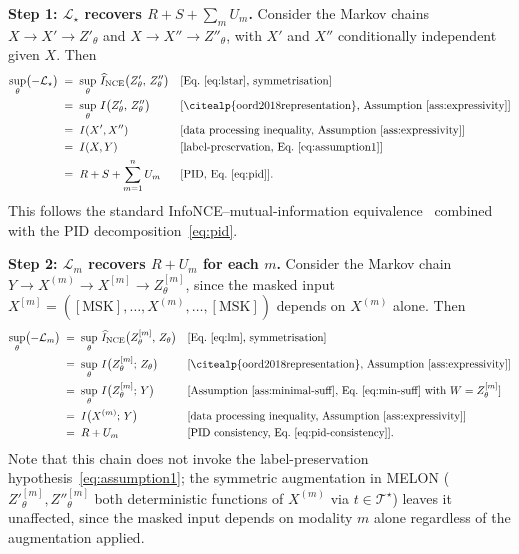 \documentclass{article}
\theoremstyle{plain}
\theoremstyle{definition}
\begin{document}
\textbf{Step 1: $\mathcal{L}_{\star}$ recovers $R + S + \sum_m U_m$.}
Consider the Markov chains $X \to X' \to Z'_\theta$ and $X \to X'' \to Z''_\theta$, with $X'$ and $X''$ conditionally independent given $X$. Then
\begin{equation}\label{eq:step1-chain}
\begin{aligned}
\sup_{\theta} \bigl(-\mathcal{L}_{\star}\bigr)
  \;&=\; \sup_{\theta}\, \widehat{I}_{\mathrm{NCE}}\bigl(Z'_\theta,\, Z''_\theta\bigr)
    && \text{[Eq.~\eqref{eq:lstar}, symmetrisation]} \\
  \;&=\; \sup_{\theta}\, I\bigl(Z'_\theta,\, Z''_\theta\bigr)
    && \text{[\citealp{oord2018representation}, Assumption~\ref{ass:expressivity}]} \\
  \;&=\; I(X', X'')
    && \text{[data processing inequality, Assumption~\ref{ass:expressivity}]} \\
  \;&=\; I(X, Y)
    && \text{[label-preservation, Eq.~\eqref{eq:assumption1}]} \\
  \;&=\; R + S + \sum_{m=1}^{n} U_m
    && \text{[PID, Eq.~\eqref{eq:pid}]}.
\end{aligned}
\end{equation}
This follows the standard InfoNCE--mutual-information equivalence~\citep{oord2018representation} combined with the PID decomposition~\eqref{eq:pid}.

\textbf{Step 2: $\mathcal{L}_{m}$ recovers $R + U_m$ for each $m$.}
Consider the Markov chain $Y \to X^{(m)} \to X^{[m]} \to Z^{[m]}_\theta$, since the masked input $X^{[m]} = ([\mathrm{MSK}], \ldots, X^{(m)}, \ldots, [\mathrm{MSK}])$ depends on $X^{(m)}$ alone. Then
\begin{equation}\label{eq:step2-chain}
\begin{aligned}
\sup_{\theta} \bigl(-\mathcal{L}_{m}\bigr)
  \;&=\; \sup_{\theta}\, \widehat{I}_{\mathrm{NCE}}\bigl(Z^{[m]}_\theta,\, Z_\theta\bigr)
    && \text{[Eq.~\eqref{eq:lm}, symmetrisation]} \\
  \;&=\; \sup_{\theta}\, I\bigl(Z^{[m]}_\theta;\, Z_\theta\bigr)
    && \text{[\citealp{oord2018representation}, Assumption~\ref{ass:expressivity}]} \\
  \;&=\; \sup_{\theta}\, I\bigl(Z^{[m]}_\theta;\, Y\bigr)
    && \text{[Assumption~\ref{ass:minimal-suff}, Eq.~\eqref{eq:min-suff} with $W = Z^{[m]}_\theta$]} \\
  \;&=\; I\bigl(X^{(m)};\, Y\bigr)
    && \text{[data processing inequality, Assumption~\ref{ass:expressivity}]} \\
  \;&=\; R + U_m
    && \text{[PID consistency, Eq.~\eqref{eq:pid-consistency}]}.
\end{aligned}
\end{equation}
Note that this chain does not invoke the label-preservation hypothesis~\eqref{eq:assumption1}; the symmetric augmentation in MELON ($Z'^{[m]}_\theta, Z''^{[m]}_\theta$ both deterministic functions of $X^{(m)}$ via $t \in \mathcal{T}^\star$) leaves it unaffected, since the masked input depends on modality $m$ alone regardless of the augmentation applied.
\end{document}
